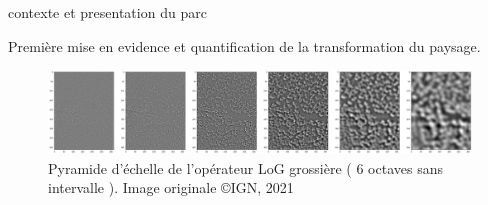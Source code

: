 \documentclass{beamer}
\begin{document}
\begin{frame}
	contexte et presentation du parc 

	Première mise en evidence et quantification de la transformation du paysage.

	\begin{figure}
	\includegraphics[scale=0.15]{index.png}
	\caption{Pyramide d'échelle de l'opérateur LoG grossière ( 6 octaves sans intervalle ). Image originale \copyright IGN, 2021  }
	\end{figure}
\end{frame}
\end{document}
